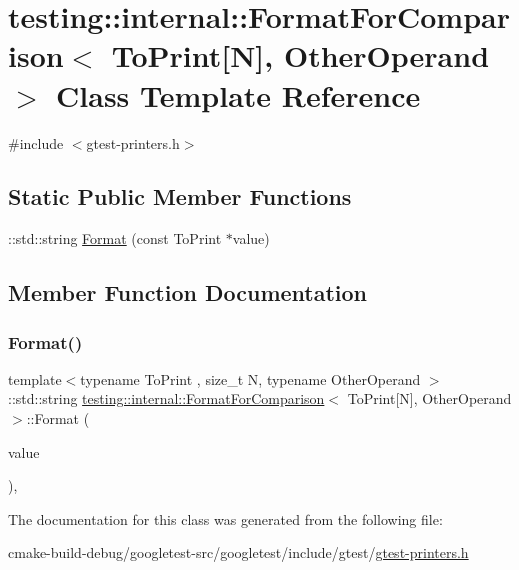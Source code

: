 \hypertarget{classtesting_1_1internal_1_1FormatForComparison_3_01ToPrint[N]_00_01OtherOperand_01_4}{}\section{testing\+::internal\+::Format\+For\+Comparison$<$ To\+Print\mbox{[}N\mbox{]}, Other\+Operand $>$ Class Template Reference}
\label{classtesting_1_1internal_1_1FormatForComparison_3_01ToPrint[N]_00_01OtherOperand_01_4}


{\ttfamily \#include $<$gtest-\/printers.\+h$>$}

\subsection*{Static Public Member Functions}
\begin{DoxyCompactItemize}
\item 
\+::std\+::string \mbox{\hyperlink{classtesting_1_1internal_1_1FormatForComparison_3_01ToPrint[N]_00_01OtherOperand_01_4_a76c526461c8fa7df75f7b32ab889b9e0}{Format}} (const To\+Print $\ast$value)
\end{DoxyCompactItemize}


\subsection{Member Function Documentation}
\mbox{\label{classtesting_1_1internal_1_1FormatForComparison_3_01ToPrint[N]_00_01OtherOperand_01_4_a76c526461c8fa7df75f7b32ab889b9e0}} 
\subsubsection{\texorpdfstring{Format()}{Format()}}
{\footnotesize\ttfamily template$<$typename To\+Print , size\+\_\+t N, typename Other\+Operand $>$ \\
\+::std\+::string \mbox{\hyperlink{classtesting_1_1internal_1_1FormatForComparison}{testing\+::internal\+::\+Format\+For\+Comparison}}$<$ To\+Print\mbox{[}N\mbox{]}, Other\+Operand $>$\+::Format (\begin{DoxyParamCaption}\item[{const To\+Print $\ast$}]{value }\end{DoxyParamCaption})\hspace{0.3cm}{\ttfamily [inline]}, {\ttfamily [static]}}



The documentation for this class was generated from the following file\+:\begin{DoxyCompactItemize}
\item 
cmake-\/build-\/debug/googletest-\/src/googletest/include/gtest/\mbox{\hyperlink{gtest-printers_8h}{gtest-\/printers.\+h}}\end{DoxyCompactItemize}

